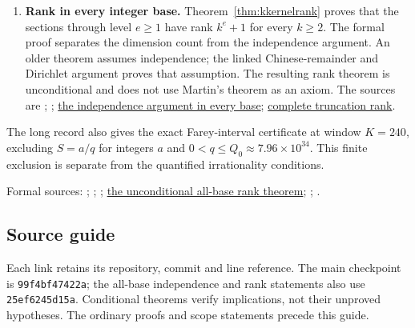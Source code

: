 \documentclass[11pt]{article}
\renewcommand{\commitshort}{99f4bf47422a}
\begin{document}
\begin{enumerate}
\item\label{res:rank}
\textbf{Rank in every integer base.} Theorem~\ref{thm:kkernelrank} proves
that the sections through level $e\ge1$ have rank $k^e+1$ for every $k\ge2$.
The formal proof separates the dimension count from the independence
argument. An older theorem assumes independence; the linked
Chinese-remainder and Dirichlet argument proves that assumption.
The resulting rank theorem is unconditional and does not use Martin's
theorem as an axiom. The sources are
;
;
\href{https://github.com/wcook04/plectis-erdos/blob/25ef6245d15a47548c6926369ae8f1a0f0a14a80/Erdos249257/AllBaseTotientKernel.lean#L1118}{the independence argument in every base};
\href{https://github.com/wcook04/plectis-erdos/blob/25ef6245d15a47548c6926369ae8f1a0f0a14a80/Erdos249257/AllBaseTotientKernel.lean#L1239}{complete truncation rank}.
\end{enumerate}

The long record also gives the exact Farey-interval certificate at
window $K=240$, excluding $S=a/q$ for integers $a$ and
$0<q\le Q_0\approx7.96\times10^{34}$. This finite exclusion is separate
from the quantified irrationality conditions.

\noindent Formal sources: ;
;
;
\href{https://github.com/wcook04/plectis-erdos/blob/25ef6245d15a47548c6926369ae8f1a0f0a14a80/Erdos249257/AllBaseTotientKernel.lean#L1239}{the unconditional all-base rank theorem};
;
.

\subsection*{Source guide}
Each link retains its repository, commit and line reference. The main
checkpoint is \texttt{\commitshort}; the all-base independence and rank
statements also use \texttt{25ef6245d15a}. Conditional theorems verify
implications, not their unproved hypotheses. The ordinary proofs and
scope statements precede this guide.
\end{document}
